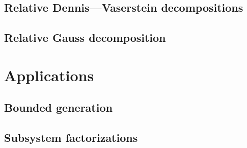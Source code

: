 \documentclass[12pt]{amsart}
\numberwithin{equation}{section}
\theoremstyle{definition}
\begin{document}
\subsection{Relative Dennis---Vaserstein decompositions}\label{sec:dennis-vaserstein}

\subsection{Relative Gauss decomposition}\label{sec:gauss}


\section{Applications}\label{sec:applications}
\subsection{Bounded generation}\label{sec:boundgen}

\subsection{Subsystem factorizations}\label{sec:subsysfact}


\printbibliography
\end{document}

